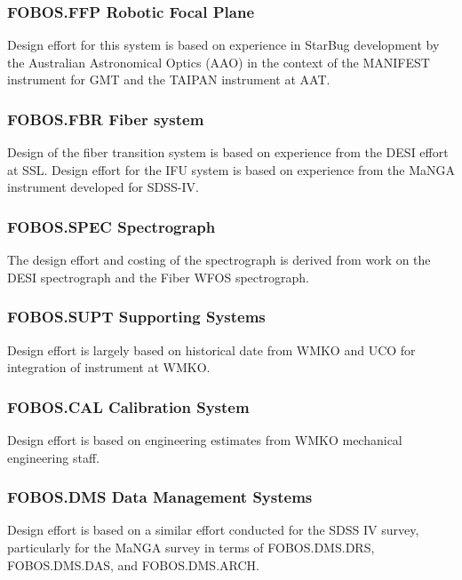 \documentclass[oneside,11pt]{amsart}
\begin{document}
\subsubsection{FOBOS.FFP Robotic Focal Plane}

Design effort for this system is based on experience in StarBug
development by the Australian Astronomical Optics (AAO) in the
context of the MANIFEST instrument for GMT and the TAIPAN instrument
at AAT.

\subsubsection{FOBOS.FBR Fiber system}

Design of the fiber transition system is based on experience from the
DESI effort at SSL. Design effort for the IFU system is based on
experience from the MaNGA instrument developed for SDSS-IV.

\subsubsection{FOBOS.SPEC Spectrograph}

The design effort and costing of the spectrograph is derived from
work on the DESI spectrograph and the Fiber WFOS spectrograph.

\subsubsection{FOBOS.SUPT Supporting Systems}

Design effort is largely based on historical date from WMKO and UCO
for integration of instrument at WMKO.

\subsubsection{FOBOS.CAL Calibration System}

Design effort is based on engineering estimates from WMKO mechanical
engineering staff.

\subsubsection{FOBOS.DMS Data Management Systems}

Design effort is based on a similar effort conducted for the SDSS IV
survey, particularly for the MaNGA survey in terms of FOBOS.DMS.DRS,
FOBOS.DMS.DAS, and FOBOS.DMS.ARCH.
\end{document}
